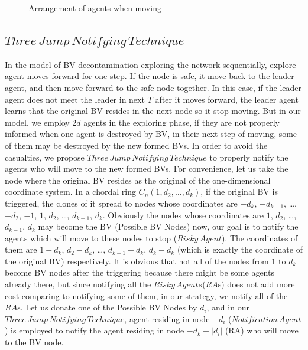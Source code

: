 \documentclass[conference]{IEEEtran}
\begin{document}
\begin{figure}
  \centering 
  \hspace{1in} 
  \caption{Arrangement of agents when moving} 
  \label{fig:subfig1} %
\end{figure}


\subsection{$Three\,Jump\,Notifying\,Technique$}
In the model of BV decontamination exploring the network sequentially, explore agent moves forward for one step. If the node is safe, it move back to the leader agent, and then move forward to the safe node together. In this case, if the leader agent does not meet the leader in next $T$ after it moves forward, the leader agent learns that the original BV resides in the next node so it stop moving. 
But in our model, we employ $2d$ agents in the exploring phase, if they are not properly informed when one agent is destroyed by BV, in their next step of moving, some of them may be destroyed by the new formed BVs. In order to avoid the casualties, we propose $Three\,Jump\,Notifying\,Technique$ to properly notify the agents who will move to the new formed BVs.
For convenience, let us take the node where the original BV resides as the original of the one-dimensional coordinate system. In a chordal ring $C_n(1, d_2, \ldots,  d_k)$, if the original BV is triggered, the clones of it spread to nodes whose coordinates are $-d_k$, $-d_{k-1}$, \ldots, $-d_2$, $-1$, $1$, $d_2$, \ldots, $d_{k-1}$, $d_k$. Obviously the nodes whose coordinates are $1$, $d_2$, \dots, $d_{k-1}$, $d_k$ may become the BV (Possible BV Nodes) now, our goal is to notify the agents which will move to these nodes to stop ($Risky\,Agent$). The coordinates of them are $1- d_k$, $d_2-d_k$, \ldots, $d_{k-1}-d_k$, $d_k-d_k$ (which is exactly the coordinate of the original BV) respectively. It is obvious that not all of the nodes from $1$ to $d_k$ become BV nodes after the triggering because there might be some agents already there, but since notifying all the $Risky\,Agents$($RA$s) does not add more cost comparing to notifying some of them, in our strategy, we notify all of the $RA$s. Let us donate one of the Possible BV Nodes by $d_i$, and in our $Three\,Jump\,Notifying\,Technique$, agent residing in node $-d_i$ ($Notification\,Agent$) is employed to notify the agent residing in node $-d_k+\left |d_i\right |$ (RA) who will move to the BV node. 
\end{document}
